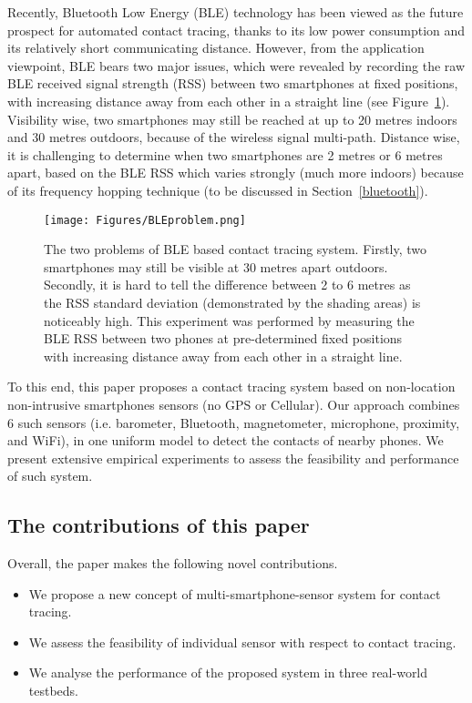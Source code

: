 \documentclass[graybox]{svmult}
\begin{document}
Recently, Bluetooth Low Energy (BLE) technology has been viewed as the future prospect for automated contact tracing, thanks to its low power consumption and its relatively short communicating distance. However, from the application viewpoint, BLE bears two major issues, which were revealed by recording the raw BLE received signal strength (RSS) between two smartphones at fixed positions, with increasing distance away from each other in a straight line (see Figure~\ref{BLEproblem}). Visibility wise, two smartphones may still be reached at up to 20 metres indoors and 30 metres outdoors, because of the wireless signal multi-path. Distance wise, it is challenging to determine when two smartphones are 2 metres or 6 metres apart, based on the BLE RSS which varies strongly (much more indoors) because of its frequency hopping technique (to be discussed in Section~\ref{bluetooth}).
\begin{figure}[h]
    \centering
    \sidecaption
    \texttt{[image: Figures/BLEproblem.png]}
    \caption{The two problems of BLE based contact tracing system. Firstly, two smartphones may still be visible at 30 metres apart outdoors. Secondly, it is hard to tell the difference between 2 to 6 metres as the RSS standard deviation (demonstrated by the shading areas) is noticeably high. This experiment was performed by measuring the BLE RSS between two phones at pre-determined fixed positions with increasing distance away from each other in a straight line.}
    \label{BLEproblem}       
\end{figure}

To this end, this paper proposes a contact tracing system based on non-location non-intrusive smartphones sensors (no GPS or Cellular). Our approach combines 6 such sensors (i.e. barometer, Bluetooth, magnetometer, microphone, proximity, and WiFi), in one uniform model to detect the contacts of nearby phones. We present extensive empirical experiments to assess the feasibility and performance of such system.

\subsection{The contributions of this paper}
Overall, the paper makes the following novel contributions.
\begin{itemize}
    \item We propose a new concept of multi-smartphone-sensor system for contact tracing.
    \item We assess the feasibility of individual sensor with respect to contact tracing.
    \item We analyse the performance of the proposed system in three real-world testbeds.
\end{itemize}
\end{document}
